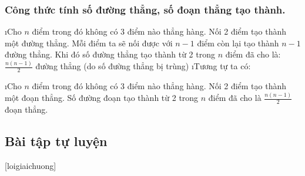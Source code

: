 \subsubsection{Công thức tính số đường thẳng, số đoạn thẳng tạo thành.}
\begin{enumerate}[--,leftmargin=*]
\i Cho $n$ điểm trong đó không có 3 điểm nào thẳng hàng. Nối 2 điểm tạo thành một đường thẳng. Mỗi điểm ta sẽ nối được với $n-1$ điểm còn lại tạo thành $n-1$ đường thẳng.
Khi đó số đường thẳng tạo thành từ 2 trong $n$ điểm đã cho là: $\frac{n(n-1)}{2}$  đường thẳng  (do số đường thẳng bị trùng)	
\i Tương tự ta có: 
\begin{enumerate}[+,leftmargin=*]
	\i Cho $n$ điểm trong đó không có 3 điểm nào thẳng hàng. Nối 2 điểm tạo thành một đoạn thẳng. Số đường đoạn tạo thành từ 2 trong $n$ điểm đã cho là $\frac{n(n-1)}{2}$ đoạn thẳng.
\end{enumerate}
\end{enumerate}
\subsection{Bài tập tự luyện}
[loigiaichuong]
